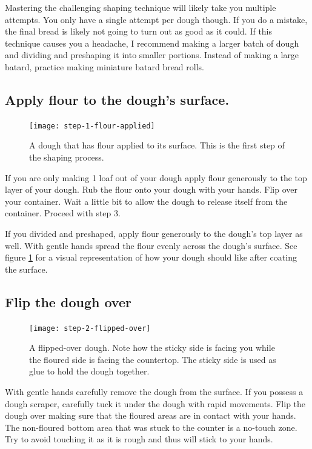 Mastering the challenging shaping technique will likely take you
multiple attempts. You only have a single attempt per dough though. If you
do a mistake, the final bread is likely not going to turn out as good
as it could. If this technique causes you a headache, I recommend making
a larger batch of dough and dividing and preshaping it into
smaller portions. Instead of making a large batard, practice making miniature
batard bread rolls.

\subsection[Flouring the surface]{Apply flour to the dough's surface.}

\begin{figure}[!htb]
  \texttt{[image: step-1-flour-applied]}
  \caption{A dough that has flour applied to its surface. This is
  the first step of the shaping process.}
  \label{fig:shaping-flour-surface}
\end{figure}

If you are only making 1 loaf out of your dough apply flour
generously to the top layer of your dough. Rub the flour onto your
dough with your hands. Flip over your container. Wait a little bit
to allow the dough to release itself from the container. Proceed
with step 3.

If you divided and preshaped, apply flour generously to the dough's
top layer as well. With gentle hands spread the flour evenly across
the dough's surface. See figure \ref{fig:shaping-flour-surface} for a
visual representation of how your dough should like after coating
the surface.

\subsection[Flipping the dough]{Flip the dough over}

\begin{figure}[!htb]
  \texttt{[image: step-2-flipped-over]}
  \caption{A flipped-over dough. Note how the sticky side is facing
  you while the floured side is facing the countertop. The sticky side
  is used as glue to hold the dough together.}
\end{figure}

With gentle hands carefully remove the dough from the surface. If
you possess a dough scraper, carefully tuck it under the dough with
rapid movements. Flip the dough over making sure that the floured
areas are in contact with your hands. The non-floured bottom area that was
stuck to the counter is a no-touch zone. Try to avoid touching it
as it is rough and thus will stick to your hands.


